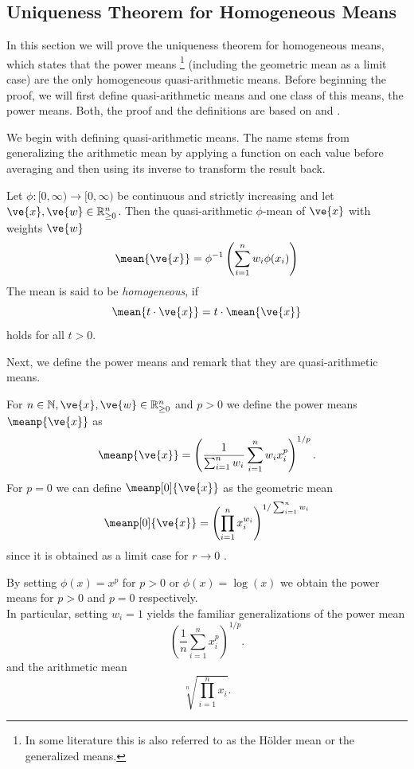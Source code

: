 \subsection{Uniqueness Theorem for Homogeneous Means} \label{sect-HLP_proof}
In this section we will prove the uniqueness theorem for homogeneous means, which states that the power means \footnote{In some literature this is also referred to as the Hölder mean or the generalized means.} (including the geometric mean as a limit case) are the only homogeneous quasi-arithmetic means.
Before beginning the proof, we will first define quasi-arithmetic means and one class of this means, the power means.
Both, the proof and the definitions are based on \parencite[p. 66-69]{hardy1952inequalities} and \parencite[p. 271-273]{handbookMeans}.

We begin with defining quasi-arithmetic means. The name stems from generalizing the arithmetic mean by applying a function on each value before averaging and then using its inverse to transform the result back.

\begin{defi}   %
	Let $\phi : [0,\infty) \rightarrow [0,\infty)$ be continuous and strictly increasing and let $\ve{x}, \ve{w} \in \mathbb{R}_{\geq 0}^n$.
	Then the quasi-arithmetic $\phi$-mean of $\ve{x}$ with weights $\ve{w}$
	$$\mean{\ve{x}} = \phi^{-1} \left ( \sum_{i=1}^{n} w_i \phi(x_i) \right)$$
	The mean is said to be \emph{homogeneous}, if
	$$\mean{t \cdot \ve{x}} = t \cdot \mean{\ve{x}}$$
	holds for all $t > 0$.
\end{defi}

Next, we define the power means and remark that they are quasi-arithmetic means.

\begin{defi}  %
	For $n \in \mathbb{N}, \ve{x}, \ve{w} \in \mathbb{R}_{\geq 0}^n$ and $ p > 0$ we define the power means $\meanp{\ve{x}}$ as
	$$ \meanp{\ve{x}} = \left ( \frac{1}{\sum_{i=1}^{n} w_i} \sum_{i=1}^{n}w_i x_i^p \right)^{1/p}. $$
	For $p=0$ we can define $\meanp[0]{\ve{x}}$ as the geometric mean
	$$
\meanp[0]{\ve{x}} = \left ( \prod_{i=1}^n x_i^{w_i} \right )^{1 / \sum_{i=1}^{n}w_i}
	$$
	since it is obtained as a limit case for $r \rightarrow 0$ \parencite[p. 176]{handbookMeans}.
\end{defi}

\begin{rem}
	By setting $\phi(x) = x^p$ for $p>0$ or $\phi(x) = \log(x)$ we obtain the power means for $p>0$ and $p=0$ respectively.\\
  In particular, setting $w_i = 1$ yields the familiar generalizations of the power mean
	$$\left ( \frac{1}{n} \sum_{i=1}^{n}x_i^p \right)^{1/p}. $$
  and the arithmetic mean
  $$\sqrt[n]{\prod_{i=1}^n x_i}.$$
\end{rem}

